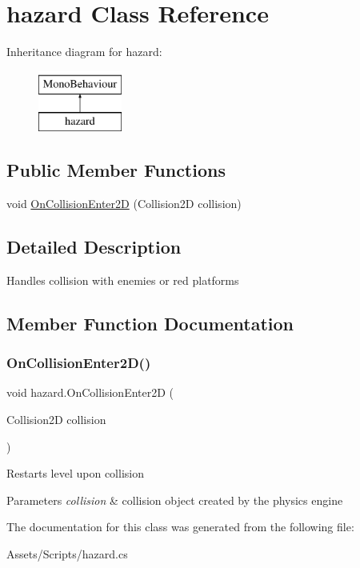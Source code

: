 \hypertarget{classhazard}{}\section{hazard Class Reference}
\label{classhazard}
Inheritance diagram for hazard\+:\begin{figure}[H]
\begin{center}
\leavevmode
\includegraphics[height=2.000000cm]{classhazard}
\end{center}
\end{figure}
\subsection*{Public Member Functions}
\begin{DoxyCompactItemize}
\item 
void \mbox{\hyperlink{classhazard_a8ad9f65467a60d2379e1b879568f9703}{On\+Collision\+Enter2D}} (Collision2D collision)
\end{DoxyCompactItemize}


\subsection{Detailed Description}
Handles collision with enemies or red platforms 

\subsection{Member Function Documentation}
\mbox{\label{classhazard_a8ad9f65467a60d2379e1b879568f9703}} 
\subsubsection{\texorpdfstring{On\+Collision\+Enter2\+D()}{OnCollisionEnter2D()}}
{\footnotesize\ttfamily void hazard.\+On\+Collision\+Enter2D (\begin{DoxyParamCaption}\item[{Collision2D}]{collision }\end{DoxyParamCaption})\hspace{0.3cm}{\ttfamily [inline]}}

Restarts level upon collision 
\begin{DoxyParams}{Parameters}
{\em collision} & collision object created by the physics engine \\
\hline
\end{DoxyParams}


The documentation for this class was generated from the following file\+:\begin{DoxyCompactItemize}
\item 
Assets/\+Scripts/hazard.\+cs\end{DoxyCompactItemize}
